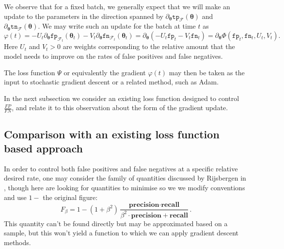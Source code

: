 \documentclass[10pt,a4paper]{article}
\begin{document}
We observe that for a fixed batch, we generally expect that we will make an update to the parameters in the direction spanned by $\partial_{\boldsymbol\theta}\texttt{tp}_{\mathcal F}(\boldsymbol\theta)$ and $\partial_{\boldsymbol\theta}\texttt{tn}_{\mathcal F}(\boldsymbol\theta)$.
We may write such an update for the batch at time $t$ as
$$
\varphi(t)=-U_t\partial_{\boldsymbol\theta}\texttt{fp}_{\mathcal F_t}(\boldsymbol\theta_t)-V_t\partial_{\boldsymbol\theta}\texttt{fn}_{\mathcal F_t}(\boldsymbol\theta_t)=\partial_{\boldsymbol\theta}(-U_t\texttt{fp}_t-V_t\texttt{fn}_t)=\partial_{\boldsymbol\theta}\Phi(\texttt{fp}_t,\texttt{fn}_t,U_t,V_t).
$$
Here $U_t$ and $V_t>0$ are weights corresponding to the relative amount that the model needs to improve on the rates of false positives and false negatives.

The loss function $\Psi$ or equivalently the gradient $\varphi(t)$ may then be taken as the input to stochastic gradient descent or a related method, such as Adam.

In the next subsection we consider an existing loss function designed to control $\tfrac{FP}{FN}$, and relate it to this observation about the form of the gradient update.
\subsection{Comparison with an existing loss function based approach}

In order to control both false positives and false negatives at a specific relative desired rate, one may consider the family of quantities discussed by Rijsbergen in \cite{van1979information}, though here are looking for quantities to minimise so we we modify conventions and use $1-$ the original figure:
$$
F_\beta=1-(1+\beta^2)\frac{\textbf{precision}\cdot\textbf{recall}}{\beta^2\cdot\textbf{precision}+\textbf{recall}}.
$$
This quantity can't be found directly but may be approximated based on a sample, but this won't yield a function to which we can apply gradient descent methods.
\end{document}
